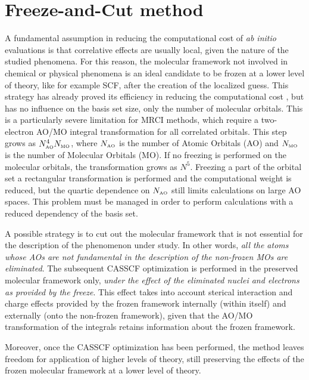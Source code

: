 \section{Freeze-and-Cut method}

A fundamental assumption in reducing the computational cost of
\textit{ab initio} evaluations is that correlative effects are usually local,
given the nature of the studied phenomena.
For this reason, the molecular framework not involved in chemical or
physical phenomena is an ideal candidate to be frozen at a lower level of
theory, like for example SCF, after the creation of the localized guess.
This strategy has already proved its efficiency in reducing the computational
cost \cite{jms_theo-681-203-2004}, but has no influence on the basis set
size, only the number of molecular orbitals. This is a particularly
severe limitation for MRCI methods, which require a two-electron AO/MO
integral transformation for all correlated orbitals.  This step grows as
$N_{\mbox{\tiny AO}}^4 N_{\mbox{\tiny MO}}$, where $N_{\mbox{\tiny AO}}$ is the number of
Atomic Orbitals (AO) and $N_{\mbox{\tiny MO}}$ is the number of Molecular
Orbitals (MO). If no freezing is performed on the molecular orbitals, the
transformation grows as $N^5$. Freezing a part of the orbital set a
rectangular transformation is performed and the computational
weight is reduced, but the quartic dependence on $N_{\mbox{\tiny AO}}$ still
limits calculations on large AO spaces. This problem must be managed in
order to perform calculations with a reduced dependency of the basis set.

A possible strategy is to cut out the molecular framework that is not
essential for the description of the phenomenon under study.  In other
words, \textit{all the atoms whose AOs are not fundamental in the description
of the non-frozen MOs are eliminated}. The subsequent CASSCF optimization is
performed in the preserved molecular framework only, \textit{under the
effect of the eliminated nuclei and electrons as provided by the freeze}.
This effect takes into account sterical interaction and charge effects
provided by the frozen framework internally (within itself) and externally
(onto the non-frozen framework), given that the AO/MO transformation of the
integrals retains information about the frozen framework.

Moreover, once the CASSCF optimization has been performed, the method
leaves freedom for application of higher levels of theory, still preserving
the effects of the frozen molecular framework at a lower level of theory.

